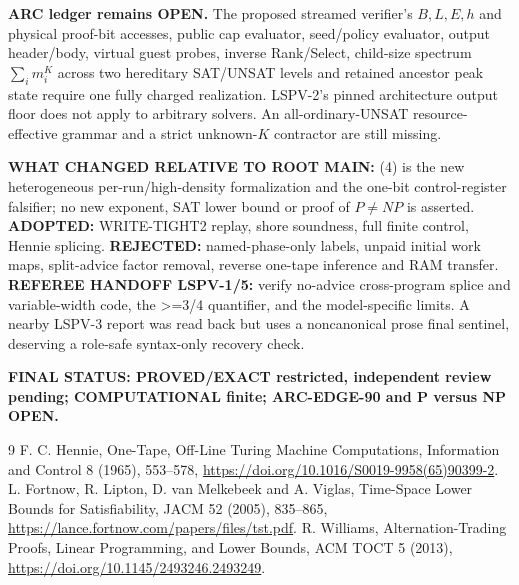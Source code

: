\documentclass[11pt]{article}
\begin{document}
\noindent\textbf{ARC ledger remains OPEN.} The proposed streamed
verifier's $B,L,E,h$ and physical proof-bit accesses,
public cap evaluator, seed/policy evaluator, output
header/body, virtual guest probes, inverse Rank/Select,
child-size spectrum $\sum_i m_i^K$ across two hereditary
SAT/UNSAT levels and retained ancestor peak state
require one fully charged realization. LSPV-2's pinned
architecture output floor does not apply to arbitrary
solvers. An all-ordinary-UNSAT resource-effective grammar
and a strict unknown-$K$ contractor are still missing.

\noindent\textbf{WHAT CHANGED RELATIVE TO ROOT MAIN:} (4)
is the new heterogeneous per-run/high-density
formalization and the one-bit control-register
falsifier; no new exponent, SAT lower bound or
proof of $P\ne NP$ is asserted.
\textbf{ADOPTED:} WRITE-TIGHT2 replay, shore
soundness, full finite control, Hennie splicing.
\textbf{REJECTED:} named-phase-only labels,
unpaid initial work maps, split-advice factor
removal, reverse one-tape inference and RAM transfer.
\textbf{REFEREE HANDOFF LSPV-1/5:} verify no-advice
cross-program splice and variable-width code,
the >=3/4 quantifier, and the model-specific limits.
A nearby LSPV-3 report was read back but uses a
noncanonical prose final sentinel, deserving a
role-safe syntax-only recovery check.

\noindent\textbf{FINAL STATUS: PROVED/EXACT restricted,
independent review pending; COMPUTATIONAL finite;
ARC-EDGE-90 and P versus NP OPEN.}

\begin{thebibliography}{9}
 F. C. Hennie, One-Tape, Off-Line Turing Machine
Computations, Information and Control 8 (1965), 553--578,
\url{https://doi.org/10.1016/S0019-9958(65)90399-2}.
 L. Fortnow, R. Lipton, D. van Melkebeek
and A. Viglas, Time-Space Lower Bounds for
Satisfiability, JACM 52 (2005), 835--865,
\url{https://lance.fortnow.com/papers/files/tst.pdf}.
 R. Williams, Alternation-Trading Proofs,
Linear Programming, and Lower Bounds, ACM TOCT 5
(2013), \url{https://doi.org/10.1145/2493246.2493249}.
\end{thebibliography}
\end{document}
